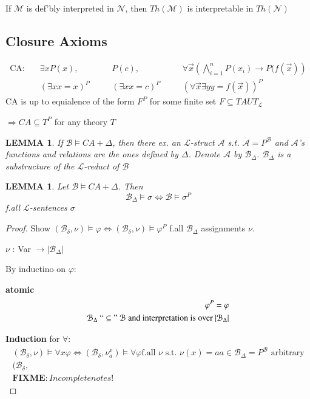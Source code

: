 \documentclass[12pt]{article}
\newcommand{\fixme}{\\ \textbf{FIXME}: Incomplete notes!}
\begin{document}
If $\mathcal{M}$ is def'bly interpreted in $\mathcal{N}$, then
$Th(\mathcal{M})$ is interpretable in $Th(\mathcal{N})$


\subsection*{Closure Axioms}
\begin{align*}
  \text{CA:} \quad &\exists x P(x),& \quad &P(c),& \quad  &\forall \vec{x}
  \left( \bigwedge_{i=1}^n  P(x_i) \rightarrow P(f(\vec{x})\right) \\
  &(\exists x x=x)^P&  &(\exists x x = c)^P& &(\forall \vec{x} \exists y y = f(\vec{x}))^P
\end{align*}
CA is up to equialence of the form $F^P$ for some
finite set $F \subseteq TAUT_\mathcal{L}$

$\Rightarrow CA \subseteq T^P$ for any theory $T$

\newtheorem*{bmodca}{LEMMA}
\begin{bmodca}
  If $\mathcal{B} \models CA + \Delta$, then there ex. an $\mathcal{L}$-struct
  $\mathcal{A}$ s.t. $\mathcal{A} = P^\mathcal{B}$ and $\mathcal{A}$'s
  functions and relations are the ones defined by $\Delta$.
  Denote $\mathcal{A}$ by $\mathcal{B}_\Delta$.
  $\mathcal{B}_\Delta$ is a substructure of the $\mathcal{L}$-reduct
  of $\mathcal{B}$
\end{bmodca}
\newtheorem*{bdeltsig}{LEMMA}
\begin{bdeltsig}
  Let $\mathcal{B} \models CA + \Delta$.
  Then 
  \[
  \mathcal{B}_\Delta \models \sigma \Leftrightarrow \mathcal{B} \models \sigma^P
  \]
  f.all $\mathcal{L}$-sentences $\sigma$
\end{bdeltsig}
\begin{proof}
  Show $(\mathcal{B}_\delta, \nu) \models \varphi \Leftrightarrow
  (\mathcal{B}_\delta, \nu) \models \varphi^P$
  f.all $\mathcal{B}_\Delta$ assignments $\nu$.

  $\nu$ : Var $\rightarrow |\mathcal{B}_\Delta|$

 By inductino on $\varphi$:

 \textbf{atomic}
 \begin{align*}
   \varphi^P = \varphi \\
   \mathcal{B}_\Delta\ ``\subseteq"\ \mathcal{B}
   \text{ and interpretation is over $|\mathcal{B}_\Delta|$}
 \end{align*}

 \textbf{Induction} for $\forall$:
  \begin{align*}
(\mathcal{B}_\delta, \nu) \models \forall x \varphi \Leftrightarrow
(\mathcal{B}_\delta, \nu^x_a) \models \forall \varphi 
\text{f.all $\nu$ s.t. $\nu(x) = a$
$a \in \mathcal{B}_\Delta = P^\mathcal{B}$ arbitrary} \\
(\mathcal{B}_\delta, 
\fixme
%
\end{align*}
\end{proof}
\end{document}
